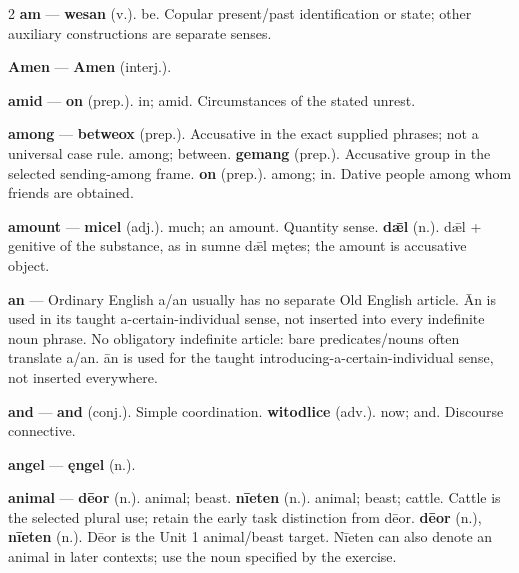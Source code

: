 \begin{multicols}{2}
\textbf{am} — \textbf{wesan} (v.). be. Copular present/past identification or state; other auxiliary constructions are separate senses.\par
\textbf{Amen} — \textbf{Amen} (interj.).\par
\textbf{amid} — \textbf{on} (prep.). in; amid. Circumstances of the stated unrest.\par
\textbf{among} — \textbf{betweox} (prep.). Accusative in the exact supplied phrases; not a universal case rule. among; between. \textbf{gemang} (prep.). Accusative group in the selected sending-among frame. \textbf{on} (prep.). among; in. Dative people among whom friends are obtained.\par
\textbf{amount} — \textbf{micel} (adj.). much; an amount. Quantity sense. \textbf{dǣl} (n.). dǣl + genitive of the substance, as in sumne dǣl mętes; the amount is accusative object.\par
\textbf{an} — Ordinary English a/an usually has no separate Old English article. Ān is used in its taught a-certain-individual sense, not inserted into every indefinite noun phrase. No obligatory indefinite article: bare predicates/nouns often translate a/an. ān is used for the taught introducing-a-certain-individual sense, not inserted everywhere.\par
\textbf{and} — \textbf{and} (conj.). Simple coordination. \textbf{witodlice} (adv.). now; and. Discourse connective.\par
\textbf{angel} — \textbf{ęngel} (n.).\par
\textbf{animal} — \textbf{dēor} (n.). animal; beast. \textbf{nīeten} (n.). animal; beast; cattle. Cattle is the selected plural use; retain the early task distinction from dēor. \textbf{dēor} (n.), \textbf{nīeten} (n.). Dēor is the Unit 1 animal/beast target. Nīeten can also denote an animal in later contexts; use the noun specified by the exercise.\par

\end{multicols}
